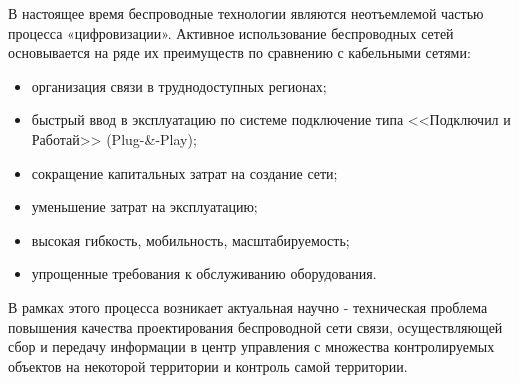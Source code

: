  

В настоящее время беспроводные технологии являются неотъемлемой частью процесса «цифровизации». Активное использование беспроводных сетей основывается на ряде их преимуществ по сравнению с кабельными сетями:
\begin{itemize}
    \item организация связи в труднодоступных регионах;
    \item быстрый ввод в эксплуатацию по системе подключение типа <<Подключил и Работай>> (Plug-\&-Play);
    \item сокращение капитальных затрат на создание сети; 
    \item уменьшение затрат на эксплуатацию;
    \item высокая гибкость, мобильность, масштабируемость;
    \item упрощенные требования к обслуживанию оборудования.
\end{itemize}

В рамках этого процесса возникает актуальная научно - техническая проблема повышения качества проектирования беспроводной сети связи, осуществляющей сбор и передачу информации в центр  управления с множества контролируемых объектов на некоторой территории и контроль самой территории.   






